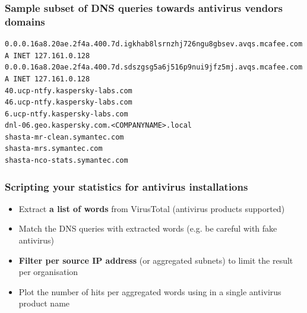 \documentclass{beamer}
\begin{document}
\begin{frame}[fragile]
\frametitle{Sample subset of DNS queries towards antivirus vendors domains}
\begin{lstlisting}
0.0.0.16a8.20ae.2f4a.400.7d.igkhab8lsrnzhj726ngu8gbsev.avqs.mcafee.com A INET 127.161.0.128
0.0.0.16a8.20ae.2f4a.400.7d.sdszgsg5a6j516p9nui9jfz5mj.avqs.mcafee.com A INET 127.161.0.128
40.ucp-ntfy.kaspersky-labs.com
46.ucp-ntfy.kaspersky-labs.com
6.ucp-ntfy.kaspersky-labs.com
dnl-06.geo.kaspersky.com.<COMPANYNAME>.local
shasta-mr-clean.symantec.com
shasta-mrs.symantec.com
shasta-nco-stats.symantec.com
\end{lstlisting}
\end{frame}

\begin{frame}
        \frametitle{Scripting your statistics for antivirus installations}
        \begin{itemize}
                \item Extract {\bf a list of words} from VirusTotal (antivirus products supported)
                \item Match the DNS queries with extracted words (e.g. be careful with fake antivirus)
                \item {\bf Filter per source IP address} (or aggregated subnets) to limit the result per organisation
                \item Plot the number of hits per aggregated words using in a single antivirus product name
        \end{itemize}
\end{frame}
\end{document}
